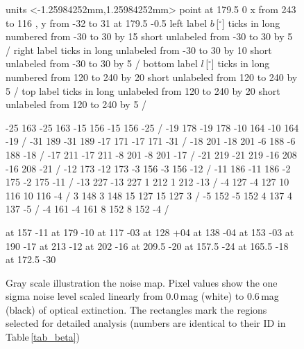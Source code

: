 \documentclass[useAMS,usenatbib]{mn2e}
\begin{document}
\begin{figure}
\beginpicture
\setcoordinatesystem units <-1.25984252mm,1.25984252mm> point at 179.5 0
\setplotarea x from 243 to 116 , y from -32 to  31
 at 179.5 -0.5
\axis left label {$b$\,[$^\circ$]}
ticks in long numbered from -30 to 30 by 15
      short unlabeled from -30 to 30 by 5 /
\axis right label {}
ticks in long unlabeled from -30 to 30 by 10
      short unlabeled from -30 to 30 by 5 /
\axis bottom label {$l$\,[$^\circ$]}
ticks in long numbered from 120 to 240 by 20
      short unlabeled from 120 to 240 by 5 /
\axis top label {}
ticks in long unlabeled from 120 to 240 by 20
      short unlabeled from 120 to 240 by 5 /

 -25 163 -25 163 -15 156 -15 156 -25 /
 -19 178 -19 178 -10 164 -10 164 -19 /
 -31 189 -31 189 -17 171 -17 171 -31 /
 -18 201 -18 201  -6 188  -6 188 -18 /
 -17 211 -17 211  -8 201  -8 201 -17 /
 -21 219 -21 219 -16 208 -16 208 -21 /
 -12 173 -12 173  -3 156  -3 156 -12 /
 -11 186 -11 186  -2 175  -2 175 -11 /
 -13 227 -13 227   1 212   1 212 -13 /
 -4 127 -4 127 10 116 10 116 -4 /
  3 148  3 148 15 127 15 127  3 /
 -5 152 -5 152  4 137  4 137 -5 /
 -4 161 -4 161  8 152  8 152 -4 /

 at 157   -11
 at 179   -10
 at 117   -03
 at 128   +04
 at 138   -04
 at 153   -03
 at 190   -17
 at 213   -12
 at 202   -16
 at 209.5 -20
 at 157.5 -24
 at 165.5 -18
 at 172.5 -30
	     	 
\endpicture 
\caption{\label{noisemap} Gray scale illustration the noise map. Pixel values
show the one sigma noise level scaled linearly from 0.0\,mag (white) to 0.6\,mag
(black) of optical extinction. The rectangles mark the regions selected for
detailed analysis (numbers are identical to their ID in Table\,\ref{tab_beta})} 
\end{figure}
\end{document}
